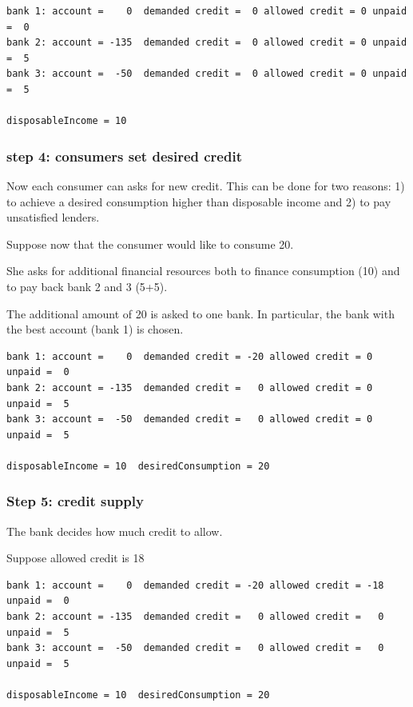 \documentclass{article}
\begin{document}
\begin{verbatim}
bank 1: account =    0  demanded credit =  0 allowed credit = 0 unpaid =  0
bank 2: account = -135  demanded credit =  0 allowed credit = 0 unpaid =  5
bank 3: account =  -50  demanded credit =  0 allowed credit = 0 unpaid =  5

disposableIncome = 10
\end{verbatim}




\subsubsection*{step 4: consumers set desired credit}
Now each consumer can asks for new credit. This can be done for two reasons: 1) to achieve a desired consumption higher than disposable income and 2) to pay unsatisfied lenders.

Suppose now that the consumer would like to consume 20.

She asks for additional financial resources both to finance consumption (10) and to pay back bank 2 and 3 (5+5).

The additional amount of 20 is asked to one bank. In particular, the bank with the best account (bank 1) is chosen. 

\begin{verbatim}
bank 1: account =    0  demanded credit = -20 allowed credit = 0 unpaid =  0
bank 2: account = -135  demanded credit =   0 allowed credit = 0 unpaid =  5
bank 3: account =  -50  demanded credit =   0 allowed credit = 0 unpaid =  5

disposableIncome = 10  desiredConsumption = 20
\end{verbatim}


\subsubsection*{Step 5: credit supply}

The bank decides how much credit to allow.

Suppose allowed credit is 18

\begin{verbatim}
bank 1: account =    0  demanded credit = -20 allowed credit = -18 unpaid =  0
bank 2: account = -135  demanded credit =   0 allowed credit =   0 unpaid =  5
bank 3: account =  -50  demanded credit =   0 allowed credit =   0 unpaid =  5

disposableIncome = 10  desiredConsumption = 20
\end{verbatim}
\end{document}
